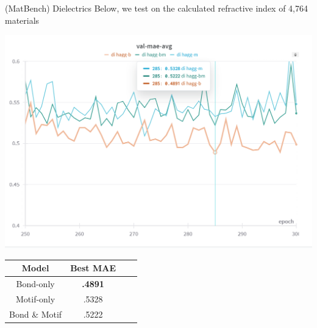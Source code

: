 \documentclass[11pt]{beamer}
\begin{document}
\begin{frame}{(MatBench) Dielectrics}\small
Below, we test on the calculated refractive index of 4,764 materials
\begin{center}
\includegraphics[scale=0.43]{dielectric.png}

\medskip

\medskip
\begin{tabular}{c|ccc}
Model & Best MAE \\
\hline
Bond-only & \textbf{.4891}\\
Motif-only & .5328\\
Bond \& Motif & .5222\\
\end{tabular}
\end{center}
\end{frame}
\end{document}
